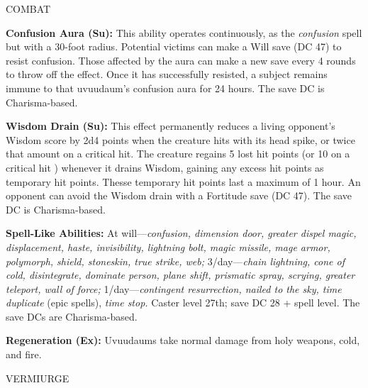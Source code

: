 \documentclass{article}
\begin{document}
{COMBAT 

\textbf{Confusion Aura (Su):} This ability operates continuously, as the \textit{confusion 
}spell but with a 30-foot radius. Potential victims can make a Will save (DC 47) 
to resist confusion. Those affected by the aura can make a new save every 4 rounds 
to throw off the effect. Once it has successfully resisted, a subject remains immune 
to that uvuudaum's confusion aura for 24 hours. The save DC is Charisma-based.

\textbf{Wisdom Drain (Su):} This effect permanently reduces a living opponent's 
Wisdom score by 2d4 points when the creature hits with its head spike, or twice 
that amount on a critical hit. The creature regains 5 lost hit points (or 10 on 
a critical hit ) whenever it drains Wisdom, gaining any excess hit points as temporary 
hit points. Thesse temporary hit points last a maximum of 1 hour. An opponent can 
avoid the Wisdom drain with a Fortitude save (DC 47). The save DC is Charisma-based.

\textbf{Spell-Like Abilities: }At will---\textit{confusion, dimension door, greater 
dispel magic, displacement, haste, invisibility, lightning bolt, magic missile, 
mage armor, polymorph, shield, stoneskin, true strike, web; }3/day---\textit{chain 
lightning, cone of cold, disintegrate, dominate person, plane shift, prismatic 
spray, scrying, greater teleport, wall of force; }1/day---\textit{contingent resurrection, 
nailed to the sky, time duplicate }(epic spells), \textit{time stop. }Caster level 
27th; save DC 28 + spell level. The save DCs are Charisma-based.

\textbf{Regeneration (Ex):} Uvuudaums take normal damage from holy weapons, cold, 
and fire. 

\vspace{12pt}
{\LARGE{}VERMIURGE }

}
\end{document}
